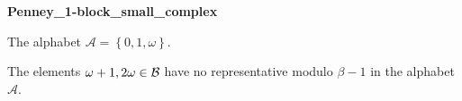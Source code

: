 \begin{exmp} 
\textbf{ Penney\_1-block\_small\_complex }

\label{ex:Penney1-blockcomplexsmall}

The alphabet $\mathcal{A} =\left\{0, 1, \omega\right\}$.

The elements $\omega + 1, 2\omega \in\mathcal{B} $ have no representative  modulo $\beta-1$ in the alphabet $\mathcal{A}$.
\end{exmp}
